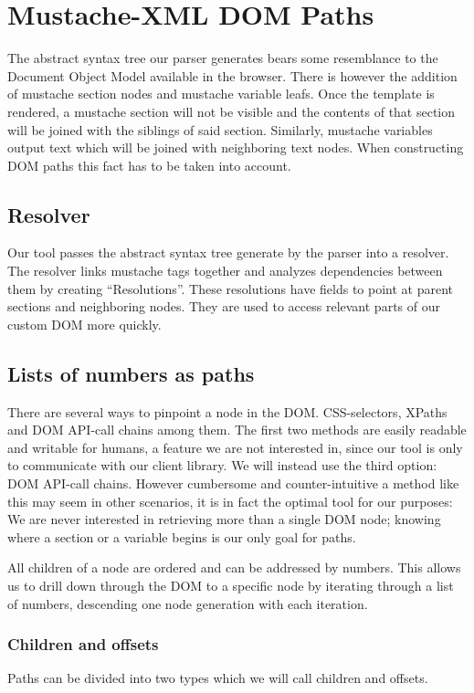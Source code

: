 \section{Mustache-XML DOM Paths}
\label{sec:paths}
The abstract syntax tree our parser generates bears some resemblance to the
Document Object Model available in the browser. There is however the addition of
mustache section nodes and mustache variable leafs.
Once the template is rendered, a mustache section will not be visible and the
contents of that section will be joined with the siblings of said section.
Similarly, mustache variables output text which will be joined with neighboring
text nodes. When constructing DOM paths this fact has to be taken into account.

\subsection{Resolver}
Our tool passes the abstract syntax tree generate by the parser into a resolver.
The resolver links mustache tags together and analyzes dependencies between
them by creating ``Resolutions''. These resolutions have fields to point at
parent sections and neighboring nodes. They are used to access relevant parts of
our custom DOM more quickly.

\subsection{Lists of numbers as paths}
There are several ways to pinpoint a node in the DOM. CSS-selectors, XPaths and
DOM API-call chains among them. The first two methods are easily
readable and writable for humans, a feature we are not interested in, since our
tool is only to communicate with our client library.
We will instead use the third option: DOM API-call chains. However cumbersome
and counter-intuitive a method like this may seem in other scenarios, it is
in fact the optimal tool for our purposes: We are never interested in retrieving
more than a single DOM node; knowing where a section or a variable begins is our
only goal for paths.

All children of a node are ordered and can be addressed by numbers. This allows
us to drill down through the DOM to a specific node by iterating through a list
of numbers, descending one node generation with each iteration.

\subsubsection{Children and offsets}
\label{sec:children-offsets}
Paths can be divided into two types which we will call children and offsets.

